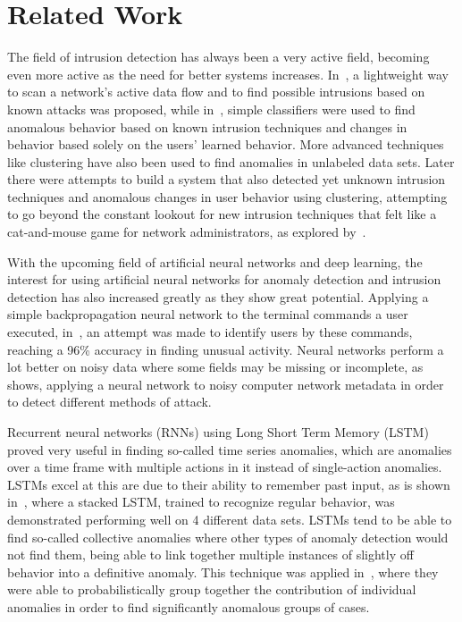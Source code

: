 \chapter{Related Work}\label{ch:related_work}

The field of intrusion detection has always been a very active field, becoming even more active as the need for better systems increases. In~\cite{roesch1999snort}, a lightweight way to scan a network's active data flow and to find possible intrusions based on known attacks was proposed, while in~\cite{lee1998data}, simple classifiers were used to find anomalous behavior based on known intrusion techniques and changes in behavior based solely on the users' learned behavior. More advanced techniques like clustering have also been used to find anomalies in unlabeled data sets. Later there were attempts to build a system that also detected yet unknown intrusion techniques and anomalous changes in user behavior using clustering, attempting to go beyond the constant lookout for new intrusion techniques that felt like a cat-and-mouse game for network administrators, as explored by~\cite{Portnoy01intrusiondetection}.

With the upcoming field of artificial neural networks and deep learning, the interest for using artificial neural networks for anomaly detection and intrusion detection has also increased greatly as they show great potential. Applying a simple backpropagation neural network to the terminal commands a user executed, in~\cite{ryan1998intrusion}, an attempt was made to identify users by these commands, reaching a 96\% accuracy in finding unusual activity. Neural networks perform a lot better on noisy data where some fields may be missing or incomplete, as~\cite{cannady1998artificial} shows, applying a neural network to noisy computer network metadata in order to detect different methods of attack.

Recurrent neural networks (RNNs) using Long Short Term Memory (LSTM) proved very useful in finding so-called time series anomalies, which are anomalies over a time frame with multiple actions in it instead of single-action anomalies. LSTMs excel at this are due to their ability to remember past input, as is shown in~\cite{malhotra2015long}, where a stacked LSTM, trained to recognize regular behavior, was demonstrated performing well on 4 different data sets. LSTMs tend to be able to find so-called collective anomalies where other types of anomaly detection would not find them, being able to link together multiple instances of slightly off behavior into a definitive anomaly. This technique was applied in~\cite{olsson2015probabilistic}, where they were able to probabilistically group together the contribution of individual anomalies in order to find significantly anomalous groups of cases.